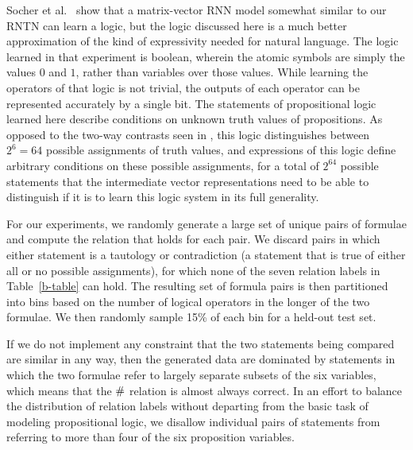 Socher et al.~\cite{socher2012semantic} show that a matrix-vector RNN
model somewhat similar to our RNTN can learn a logic, but the logic
discussed here is a much better approximation of the kind of
expressivity needed for natural language. The logic learned in that
experiment is boolean, wherein the atomic symbols are simply the
values $0$ and $1$, rather than variables over those values. While
learning the operators of that logic is not trivial, the outputs of
each operator can be represented accurately by a single bit. The
statements of propositional logic learned here describe conditions on
unknown truth values of propositions. As opposed to the two-way
contrasts seen in \cite{socher2012semantic}, this logic distinguishes
between $2^{6} = 64$ possible assignments of truth values, and
expressions of this logic define arbitrary conditions on these
possible assignments, for a total of $2^{64}$ %
possible statements that the intermediate vector representations need
to be able to distinguish if it is to learn this logic system in its
full generality.

For our experiments, we randomly generate a large set of  unique pairs 
of formulae and compute the relation that holds for each pair.
We discard pairs in which either statement is a tautology or
contradiction (a statement that is true of either all or no possible
assignments), for which none of the seven relation labels in
Table~\ref{b-table} can hold. The resulting set of formula pairs is
then partitioned into bins based on the number of logical operators in
the longer of the two formulae. We then randomly sample 15\% of each
bin for a held-out test set.

If we do not implement any constraint that the two statements being
compared are similar in any way, then the generated data are dominated
by statements in which the two formulae refer to largely separate
subsets of the six variables, which means that the $\mathbin{\#}$ relation
is almost always correct.  In an effort to balance the distribution of
relation labels without departing from the basic task of modeling
propositional logic, we disallow individual pairs of statements from
referring to more than four of the six proposition variables.

